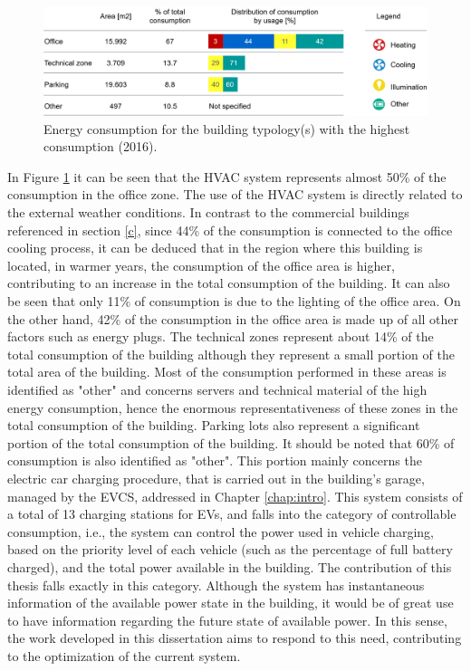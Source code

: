 \begin{figure}[h!]
    \centering
    \begin{center}
    \includegraphics[width=1\textwidth]{Images/ConsumoEDP.png}
    \caption{Energy consumption for the building typology(s) with the highest consumption (2016).}
    \label{consedp}
    \end{center}
\end{figure}
In Figure \ref{consedp} it can be seen that the \ac{HVAC} system represents almost 50\% of the consumption in the office zone. The use of the \ac{HVAC} system is directly related to the external weather conditions. In contrast to the commercial buildings referenced in section \ref{c}, since 44\% of the consumption is connected to the office cooling process, it can be deduced that in the region where this building is located, in warmer years, the consumption of the office area is higher, contributing to an increase in the total consumption of the building. It can also be seen that only 11\% of consumption is due to the lighting of the office area. On the other hand, 42\% of the consumption in the office area is made up of all other factors such as energy plugs. The technical zones represent about 14\% of the total consumption of the building although they represent a small portion of the total area of the building. Most of the consumption performed in these areas is identified as "other" and concerns servers and technical material of the high energy consumption, hence the enormous representativeness of these zones in the total consumption of the building. Parking lots also represent a significant portion of the total consumption of the building. It should be noted that 60\% of consumption is also identified as "other". This portion mainly concerns the electric car charging procedure, that is carried out in the building's garage, managed by the \ac{EVCS}, addressed in Chapter \ref{chap:intro}. This system consists of a total of 13 charging stations for \ac{EV}s, and falls into the category of controllable consumption, i.e., the system can control the power used in vehicle charging, based on the priority level of each vehicle (such as the percentage of full battery charged), and the total power available in the building. The contribution of this thesis falls exactly in this category. Although the system has instantaneous information of the available power state in the building, it would be of great use to have information regarding the future state of available power. In this sense, the work developed in this dissertation aims to respond to this need, contributing to the optimization of the current system.

